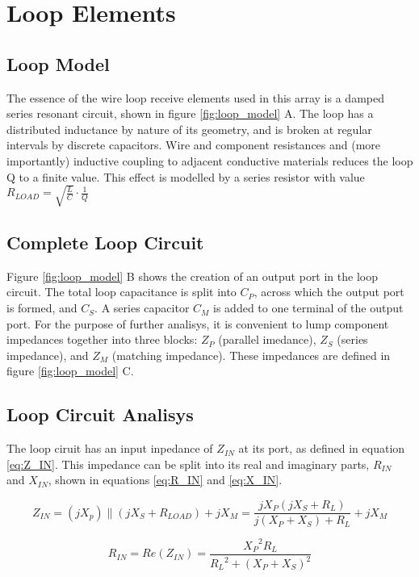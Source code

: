 \chapter{Loop Elements}

\section{Loop Model}
The essence of the wire loop receive elements used in this array is a damped series resonant circuit, shown in figure
\ref{fig:loop_model} A. The loop has a distributed inductance by nature of its geometry, and is broken at regular
intervals by discrete capacitors.  Wire and component resistances and (more importantly) inductive coupling to adjacent
conductive materials reduces the loop Q to a finite value. This effect is modelled by a series resistor with value
$R_{LOAD}=\sqrt{\frac{L}{C}}\cdot\frac{1}{Q}$

\section{Complete Loop Circuit}
Figure \ref{fig:loop_model} B shows the creation of an output port in the loop circuit. The total loop capacitance is split into $C_P$, 
across which the output port is formed, and $C_S$. A series capacitor $C_M$ is added to one terminal of the output port.
For the purpose of further analisys, it is convenient to lump component impedances together into three blocks: $Z_P$ (parallel
imedance), $Z_S$ (series impedance), and $Z_M$ (matching impedance). These impedances are defined in figure \ref{fig:loop_model} C.

\section{Loop Circuit Analisys}
The loop ciruit has an input inpedance of $Z_{IN}$ at its port, as defined in equation \ref{eq:Z_IN}. This impedance can
be split into its real and imaginary parts, $R_{IN}$ and $X_{IN}$, shown in equations \ref{eq:R_IN} and \ref{eq:X_IN}.

\begin{equation} \label{eq:Z_IN}
    Z_{IN}=(jX_p)\parallel(jX_S+R_{LOAD})+jX_M = \frac{j X_P (j X_S + R_L)}{j (X_P + X_S) + R_L} + j X_M
\end{equation}

\begin{equation} \label{eq:R_IN}
    R_{IN}=Re(Z_{IN})=\frac{{X_P}^2 R_L}{{R_L}^2+(X_P+X_S)^2}
\end{equation}

